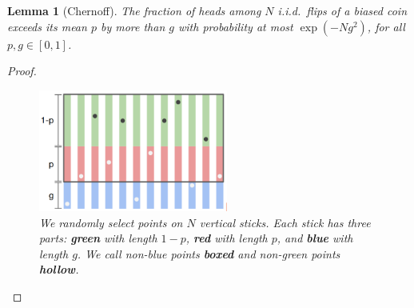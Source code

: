 \documentclass[twocolumn]{article}
\newtheorem{lem}{Lemma}
\theoremstyle{definition}
\begin{document}
    \begin{lem}[Chernoff]
        The fraction of heads among $N$ i.i.d.\ flips of a biased coin
        exceeds its mean $p$ by more than $g$ with probability at most 
        $\exp(-Ng^2)$, for all $p, g\in[0,1]$.
    \end{lem}

    \begin{proof}
            \begin{figure}[h!]
                \centering
                \includegraphics[height=4cm]{chernoff}
                \caption{\emph{
                    We randomly select points on $N$ vertical sticks.  Each
                    stick has three parts: \textbf{green} with length $1-p$,
                    \textbf{red} with length $p$, and \textbf{blue} with length
                    $g$.  We call non-blue points \textbf{boxed} and non-green
                    points \textbf{hollow}.
                }}
                \label{fig:chernoff}
            \end{figure}


\end{proof}
\end{document}
